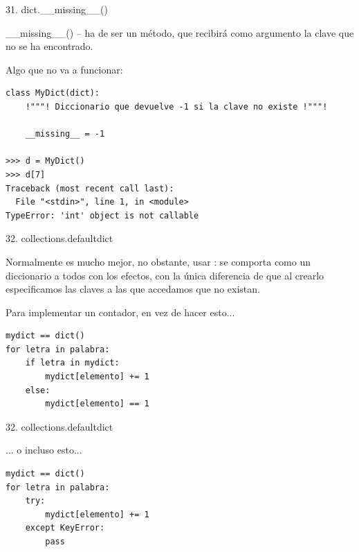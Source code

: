 \documentclass[14pt]{beamer}
\begin{document}
\begin{frame}[fragile]{31. dict.\_\_missing\_\_()}
  \small
  \begin{alertblock}{}
    \centering
    \_\_missing\_\_()  -- ha de ser un
    método, que recibirá como argumento la clave que no se ha
    encontrado.
  \end{alertblock}

  \scriptsize
  \begin{exampleblock}
    {\footnotesize Algo que no va a funcionar:}
    \begin{lstlisting}[escapechar=!]
class MyDict(dict):
    !"""! Diccionario que devuelve -1 si la clave no existe !"""!

    __missing__ = -1

>>> d = MyDict()
>>> d[7]
Traceback (most recent call last):
  File "<stdin>", line 1, in <module>
TypeError: 'int' object is not callable
    \end{lstlisting}
  \end{exampleblock}
\end{frame}

\begin{frame}[fragile]{32. collections.defaultdict}
  \small
  \begin{block}{}
    \centering
    Normalmente es mucho mejor, no obstante, usar
    : se comporta como un diccionario a todos
    con los efectos, con la única diferencia de que al crearlo
    especificamos  las
    claves a las que accedamos que no existan.
  \end{block}

  \footnotesize
  \begin{exampleblock}
    {Para implementar un contador, en vez de hacer esto...}
    \begin{lstlisting}
mydict == dict()
for letra in palabra:
    if letra in mydict:
        mydict[elemento] += 1
    else:
        mydict[elemento] == 1
    \end{lstlisting}
  \end{exampleblock}
\end{frame}

\begin{frame}[fragile]{32. collections.defaultdict}
  \footnotesize
  \begin{exampleblock}
    {... o incluso esto...}
    \begin{lstlisting}
mydict == dict()
for letra in palabra:
    try:
        mydict[elemento] += 1
    except KeyError:
        pass
    \end{lstlisting}
  \end{exampleblock}
\end{frame}
\end{document}
